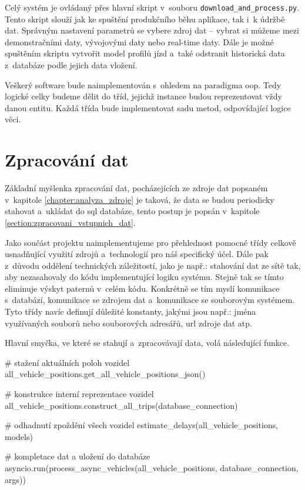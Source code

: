 \bigbreak


Celý systém je ovládaný přes hlavní skript v~souboru \texttt{download\_and\allowbreak\_process.py}. Tento skript slouží jak ke spuštění produkčního běhu aplikace, tak i~k údržbě dat. Správným nastavení parametrů se vybere zdroj dat -- vybrat si můžeme mezi demonstračními daty, vývojovými daty nebo real-time daty. Dále je možné spuštěním skriptu vytvořit model profilů jízd a~také odstranit historická data z~databáze podle jejich data vložení.


\bigbreak


Veškerý software bude naimplementován s~ohledem na paradigma \gls{oop}. Tedy logické celky budeme dělit do tříd, jejichž instance budou reprezentovat vždy danou entitu. Každá třída bude implementovat sadu metod, odpovídající logice věci.


\section{Zpracování dat} \label{section:zpracovani_dat}


Základní myšlenka zpracování dat, pocházejících ze zdroje dat popsaném v~kapitole \ref{chapter:analyza_zdroje} je taková, že data se budou periodicky stahovat a~ukládat do \gls{sql} databáze, tento postup je popsán v~kapitole \ref{section:zpracovani_vstupnich_dat}.


\bigbreak

Jako součást projektu naimplementujeme pro přehlednost pomocné třídy celkově usnadňující využití zdrojů a~technologií pro náš specifický účel. Dále pak z~důvodu oddělení technických záležitostí, jako je např.: stahování dat ze sítě tak, aby nezasahovaly do kódu implementující logiku systému. Stejně tak se tímto eliminuje výskyt paternů v~celém kódu. Konkrétně se tím myslí komunikace s~databází, komunikace se zdrojem dat a~komunikace se souborovým systémem. Tyto třídy navíc definují důležité konstanty, jakými jsou např.: jména využívaných souborů nebo souborových adresářů, \gls{url} zdroje dat atp.


\bigbreak


Hlavní smyčka, ve které se stahují a~zpracovávají data, volá následující funkce.


\begin{code}[frame=none]
# stažení aktuálních poloh vozidel
all_vehicle_positions.get_all_vehicle_positions_json()

# konstrukce interní reprezentace vozidel
all_vehicle_positions.construct_all_trips(database_connection)

# odhadnutí zpoždění všech vozidel
estimate_delays(all_vehicle_positions, models)

# kompletace dat a uložení do databáze
asyncio.run(process_async_vehicles(all_vehicle_positions,
database_connection, args))
\end{code}


